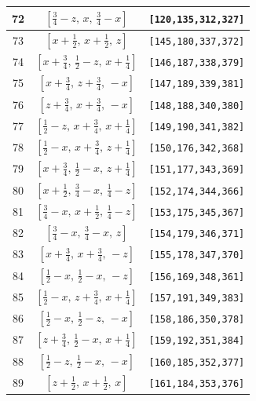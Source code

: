 \documentclass[fleqn,8pt]{jsarticle}
\begin{document}
\begin{longtable}{ccc}
72 & $\left[ \frac{3}{4} - z,\, x,\, \frac{3}{4} - x \right]$ & {\tt [120,135,312,327]} \\ \hline
73 & $\left[ x + \frac{1}{2},\, x + \frac{1}{2},\, z \right]$ & {\tt [145,180,337,372]} \\ \hline
74 & $\left[ x + \frac{3}{4},\, \frac{1}{2} - z,\, x + \frac{1}{4} \right]$ & {\tt [146,187,338,379]} \\ \hline
75 & $\left[ x + \frac{3}{4},\, z + \frac{3}{4},\, - x \right]$ & {\tt [147,189,339,381]} \\ \hline
76 & $\left[ z + \frac{3}{4},\, x + \frac{3}{4},\, - x \right]$ & {\tt [148,188,340,380]} \\ \hline
77 & $\left[ \frac{1}{2} - z,\, x + \frac{3}{4},\, x + \frac{1}{4} \right]$ & {\tt [149,190,341,382]} \\ \hline
78 & $\left[ \frac{1}{2} - x,\, x + \frac{3}{4},\, z + \frac{1}{4} \right]$ & {\tt [150,176,342,368]} \\ \hline
79 & $\left[ x + \frac{3}{4},\, \frac{1}{2} - x,\, z + \frac{1}{4} \right]$ & {\tt [151,177,343,369]} \\ \hline
80 & $\left[ x + \frac{1}{2},\, \frac{3}{4} - x,\, \frac{1}{4} - z \right]$ & {\tt [152,174,344,366]} \\ \hline
81 & $\left[ \frac{3}{4} - x,\, x + \frac{1}{2},\, \frac{1}{4} - z \right]$ & {\tt [153,175,345,367]} \\ \hline
82 & $\left[ \frac{3}{4} - x,\, \frac{3}{4} - x,\, z \right]$ & {\tt [154,179,346,371]} \\ \hline
83 & $\left[ x + \frac{3}{4},\, x + \frac{3}{4},\, - z \right]$ & {\tt [155,178,347,370]} \\ \hline
84 & $\left[ \frac{1}{2} - x,\, \frac{1}{2} - x,\, - z \right]$ & {\tt [156,169,348,361]} \\ \hline
85 & $\left[ \frac{1}{2} - x,\, z + \frac{3}{4},\, x + \frac{1}{4} \right]$ & {\tt [157,191,349,383]} \\ \hline
86 & $\left[ \frac{1}{2} - x,\, \frac{1}{2} - z,\, - x \right]$ & {\tt [158,186,350,378]} \\ \hline
87 & $\left[ z + \frac{3}{4},\, \frac{1}{2} - x,\, x + \frac{1}{4} \right]$ & {\tt [159,192,351,384]} \\ \hline
88 & $\left[ \frac{1}{2} - z,\, \frac{1}{2} - x,\, - x \right]$ & {\tt [160,185,352,377]} \\ \hline
89 & $\left[ z + \frac{1}{2},\, x + \frac{1}{2},\, x \right]$ & {\tt [161,184,353,376]} \\ \hline

\end{longtable}
\end{document}
